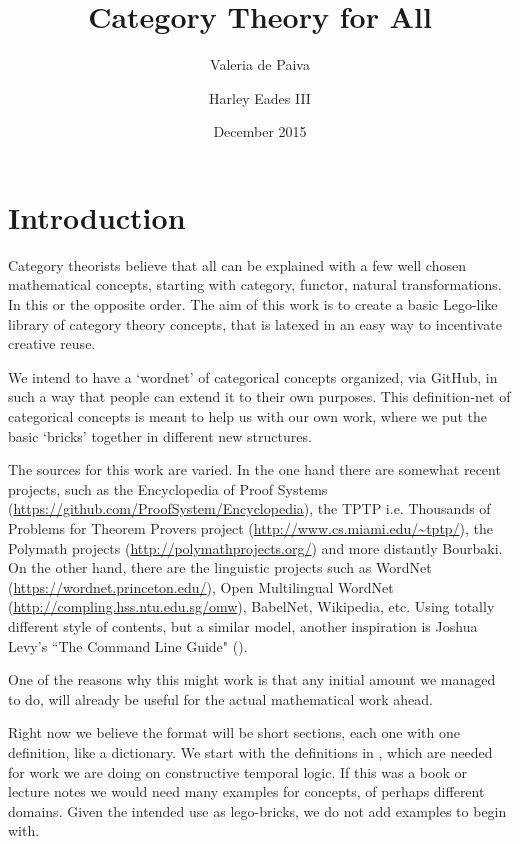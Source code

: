 \documentclass{article}
\title{Category Theory for All}
\author{Valeria de Paiva \and Harley Eades III}
\date{December 2015}
\begin{document}
\maketitle

\section*{Introduction}

Category theorists believe that all can be explained with a few well chosen mathematical concepts, starting with category, 
functor, natural transformations. In this or the opposite order. The aim of this work is to create a basic 
Lego-like library  of category theory concepts, that is latexed in an easy way to incentivate creative reuse. 

We intend to have a `wordnet' of categorical concepts organized, via GitHub, in such a way that people can 
extend it to their own purposes. This definition-net of categorical concepts is meant to help us with our 
own work, where we put the basic `bricks' together in different new structures.

The  sources for this work are varied. In the one hand there are somewhat recent projects, such as the  
Encyclopedia of Proof Systems (\url{https://github.com/ProofSystem/Encyclopedia}), 
the TPTP i.e. Thousands of Problems for Theorem Provers project (\url{http://www.cs.miami.edu/~tptp/}),   
the Polymath projects (\url{http://polymathprojects.org/}) and  more distantly Bourbaki. 
On the other hand, there are the linguistic projects such as WordNet (\url{https://wordnet.princeton.edu/}), 
Open Multilingual WordNet (\url{http://compling.hss.ntu.edu.sg/omw}), BabelNet, Wikipedia, etc.  
Using totally  different style of contents, but a similar model, another inspiration is 
Joshua Levy's ``The Command Line Guide" (\url{}).

One of the reasons why this might work is that any initial amount we managed to do, 
will already be useful for the actual mathematical work ahead. 

Right now we believe the format will be short sections, each one  with one definition, like a dictionary. 
We start with the definitions in \citep{depaiva1996}, which are needed for work we are doing on 
constructive temporal logic. If this was a book or lecture notes we would need many examples for concepts, 
of perhaps different domains. Given the intended use as lego-bricks, we do not add examples to begin with.
\end{document}

